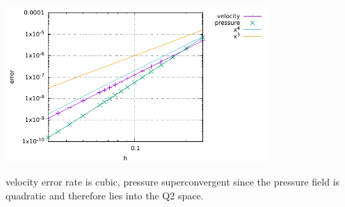 \begin{center}
\includegraphics[width=10cm]{python_codes/fieldstone_saddlepoint_q3q2/errors}
\end{center}

velocity error rate is cubic, pressure superconvergent since the pressure field
is quadratic and therefore lies into the Q2 space.
